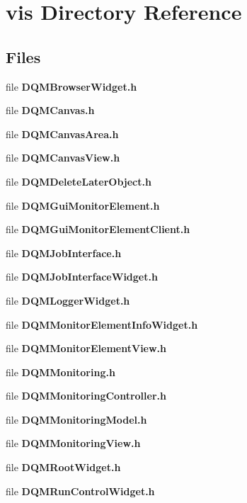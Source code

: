 \section{vis Directory Reference}
\label{dir_6b51b65c40151f136b3678ced74b515f}
\subsection*{Files}
\begin{DoxyCompactItemize}
\item 
file {\bf D\+Q\+M\+Browser\+Widget.\+h}
\item 
file {\bf D\+Q\+M\+Canvas.\+h}
\item 
file {\bf D\+Q\+M\+Canvas\+Area.\+h}
\item 
file {\bf D\+Q\+M\+Canvas\+View.\+h}
\item 
file {\bf D\+Q\+M\+Delete\+Later\+Object.\+h}
\item 
file {\bf D\+Q\+M\+Gui\+Monitor\+Element.\+h}
\item 
file {\bf D\+Q\+M\+Gui\+Monitor\+Element\+Client.\+h}
\item 
file {\bf D\+Q\+M\+Job\+Interface.\+h}
\item 
file {\bf D\+Q\+M\+Job\+Interface\+Widget.\+h}
\item 
file {\bf D\+Q\+M\+Logger\+Widget.\+h}
\item 
file {\bf D\+Q\+M\+Monitor\+Element\+Info\+Widget.\+h}
\item 
file {\bf D\+Q\+M\+Monitor\+Element\+View.\+h}
\item 
file {\bf D\+Q\+M\+Monitoring.\+h}
\item 
file {\bf D\+Q\+M\+Monitoring\+Controller.\+h}
\item 
file {\bf D\+Q\+M\+Monitoring\+Model.\+h}
\item 
file {\bf D\+Q\+M\+Monitoring\+View.\+h}
\item 
file {\bf D\+Q\+M\+Root\+Widget.\+h}
\item 
file {\bf D\+Q\+M\+Run\+Control\+Widget.\+h}
\end{DoxyCompactItemize}
